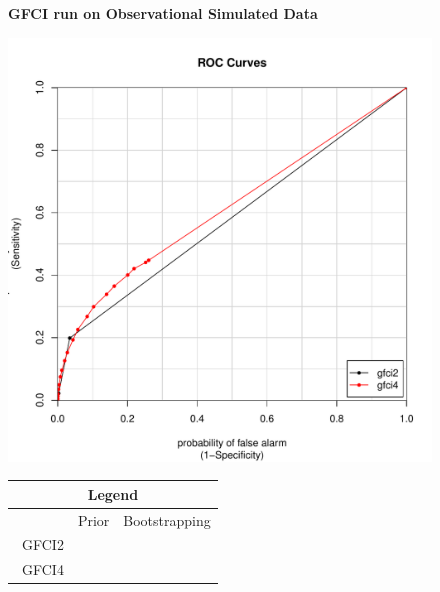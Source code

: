 \documentclass[a4paper,pdf]{article}
\newcommand{\cmark}{\color{green}{\ding{51}}}%
\newcommand{\xmark}{\color{red}{\ding{55}}}
\begin{document}
\begin{figure}[!ht]
    \centering
    \large{\textbf{GFCI run on Observational Simulated Data}}\\
        \begin{minipage}{0.6\linewidth}
            \centering
            \includegraphics[width=\textwidth]{combinedSimCurvesgfciobsSim}
        \end{minipage}
        \begin{minipage}{0.3\linewidth}
        {\footnotesize
            \renewcommand{\arraystretch}{1}
            \setlength{\tabcolsep}{5pt}
            \begin{tabular}{|r|c|c|}
              \multicolumn{3}{c}{\large{\textbf{Legend}}}\\
                \hline
                       & Prior & Bootstrapping\\\
                 GFCI2 & \xmark & \xmark\\
                 GFCI4 & \xmark & \cmark\\
                 \hline
            \end{tabular}
            }
        \end{minipage}\hfill


\end{figure}
\end{document}

